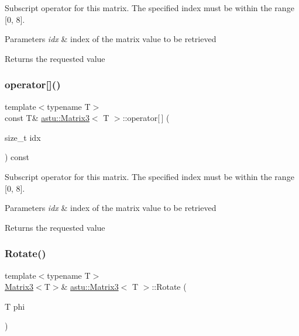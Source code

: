 Subscript operator for this matrix. The specified index must be within the range \mbox{[}0, 8\mbox{]}.


\begin{DoxyParams}{Parameters}
{\em idx} & index of the matrix value to be retrieved \\
\hline
\end{DoxyParams}
\begin{DoxyReturn}{Returns}
the requested value 
\end{DoxyReturn}
\mbox{\label{classastu_1_1Matrix3_ad9594a29b27e29bdfdd4b8e0f6138c42}} 
\subsubsection{\texorpdfstring{operator[]()}{operator[]()}\hspace{0.1cm}{\footnotesize\ttfamily [2/2]}}
{\footnotesize\ttfamily template$<$typename T$>$ \\
const T\& \hyperlink{classastu_1_1Matrix3}{astu\+::\+Matrix3}$<$ T $>$\+::operator\mbox{[}$\,$\mbox{]} (\begin{DoxyParamCaption}\item[{size\+\_\+t}]{idx }\end{DoxyParamCaption}) const\hspace{0.3cm}{\ttfamily [inline]}}

Subscript operator for this matrix. The specified index must be within the range \mbox{[}0, 8\mbox{]}.


\begin{DoxyParams}{Parameters}
{\em idx} & index of the matrix value to be retrieved \\
\hline
\end{DoxyParams}
\begin{DoxyReturn}{Returns}
the requested value 
\end{DoxyReturn}
\mbox{\label{classastu_1_1Matrix3_a8169f310b4eabb938e0cf388569cd88d}} 
\subsubsection{\texorpdfstring{Rotate()}{Rotate()}}
{\footnotesize\ttfamily template$<$typename T$>$ \\
\hyperlink{classastu_1_1Matrix3}{Matrix3}$<$T$>$\& \hyperlink{classastu_1_1Matrix3}{astu\+::\+Matrix3}$<$ T $>$\+::Rotate (\begin{DoxyParamCaption}\item[{T}]{phi }\end{DoxyParamCaption})\hspace{0.3cm}{\ttfamily [inline]}}

